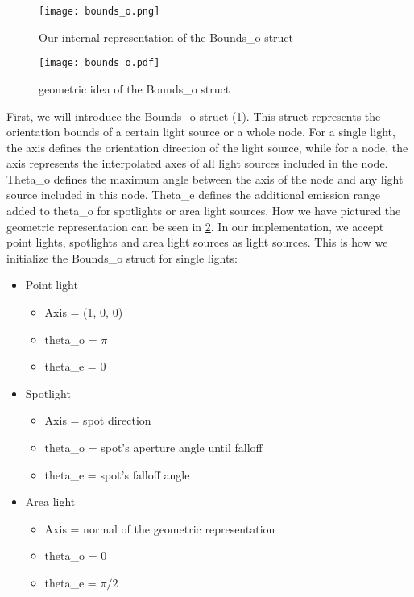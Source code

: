 \begin{figure}
	\begin{center}
		\texttt{[image: bounds\_o.png]}
		\caption{Our internal representation of the Bounds\_o struct}
		\label{fig:boundso}
	\end{center}
\end{figure}

\begin{figure}
	\begin{center}
		\texttt{[image: bounds\_o.pdf]}
		\caption{geometric idea of the Bounds\_o struct}
		\label{fig:boundsogeo}
	\end{center}
\end{figure}

First, we will introduce the Bounds\_o struct (\ref{fig:boundso}). This struct represents the orientation bounds of a certain light source or a whole node. For a single light, the axis defines the orientation direction of the light source, while for a node, the axis represents the interpolated axes of all light sources included in the node. Theta\_o defines the maximum angle between the axis of the node and any light source included in this node. Theta\_e defines the additional emission range added to theta\_o for spotlights or area light sources. How we have pictured the geometric representation can be seen in \ref{fig:boundsogeo}. In our implementation, we accept point lights, spotlights and area light sources as light sources. This is how we initialize the Bounds\_o struct for single lights:

\begin{itemize}
	  \setlength\itemsep{0em}
	\item Point light
	\begin{itemize}
		  \setlength\itemsep{0em}
		\item Axis = (1, 0, 0)
		\item theta\_o = $\pi$
		\item theta\_e = 0
	\end{itemize}
	\item Spotlight
	\begin{itemize}
		  \setlength\itemsep{0em}
		\item Axis = spot direction
		\item theta\_o = spot's aperture angle until falloff
		\item theta\_e = spot's falloff angle
	\end{itemize}
	\item Area light
	\begin{itemize}
		  \setlength\itemsep{0em}
		\item Axis = normal of the geometric representation
		\item theta\_o = 0
		\item theta\_e = $\pi/2$
	\end{itemize}
\end{itemize}

